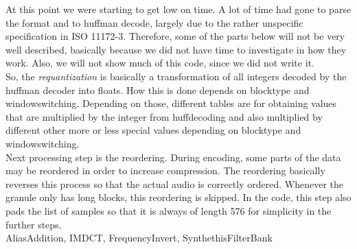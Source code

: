\documentclass[a4paper,12pt]{article}
\begin{document}
        At this point we were starting to get low on time. A lot of time had
        gone to parse the format and to huffman decode, largely due to the
        rather unspecific specification in ISO 11172-3. Therefore, some of the
        parts below will not be very well described, basically because we did
        not have time to investigate in how they work. Also, we will not show
        much of this code, since we did not write it. \\

        So, the \textit{requantization} is basically a transformation of all
        integers decoded by the huffman decoder into floats. How this is done
        depends on blocktype and windowswitching. Depending on those, different
        tables are for obtaining values that are multiplied by the integer from
        huffdecoding and also multiplied by different other more or less special
        values depending on blocktype and windowswitching. \\

        Next processing step is the reordering. During encoding, some parts of
        the data may be reordered in order to increase compression. The
        reordering basically reverses this process so that the actual audio is
        correctly ordered. Whenever the granule only has long blocks, this
        reordering is skipped. In the code, this step also pads the list of
        samples so that it is always of length 576 for simplicity in the further
        steps. \\
        
        AliasAddition, IMDCT, FrequencyInvert, SynthethisFilterBank \\
\end{document}
